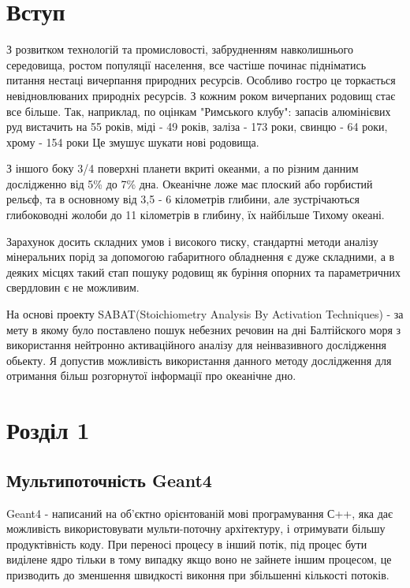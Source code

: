 \documentclass[a4paper, 14pt]{article}
\numberwithin{equation}{section}
\numberwithin{table}{section}
\begin{document}
\newpage
\tableofcontents
\newpage
\pagestyle{plain}
\setcounter{page}{2}
	
\newpage
\section{Вступ}

З розвитком технологій та промисловості, забрудненням навколишнього середовища, ростом популяції населення, все частіше починає підніматись питання нестаці вичерпання природних ресурсів. Особливо гостро це торкається невідновлюваних природніх ресурсів. З кожним роком вичерпаних родовищ стає все більше. Так, наприклад, по оцінкам "Римського клубу": запасів алюмінієвих руд вистачить на 55 років, міді - 49 років, заліза - 173 роки, свинцю - 64 роки, хрому - 154 роки Це змушує шукати нові родовища.

З іншого боку 3/4 поверхні планети вкриті океанми, а по різним данним дослідженно від 5\% до 7\% дна.
Океанічне ложе має плоский або горбистий рельєф, та в основному від 3,5 - 6 кілометрів глибини, але зустрічаються глибоководні жолоби до 11 кілометрів в глибину, їх найбільше Тихому океані. 

Зарахунок досить складних умов і високого тиску, стандартні методи аналізу мінеральних порід за допомогою габаритного обладнення є дуже складними, а в деяких місцях такий єтап пошуку родовищ як буріння опорних та параметричних свердловин є не можливим.

На основі проекту SABAT(Stoichiometry Analysis By Activation Techniques) - за мету в якому було поставлено пошук небезних речовин на дні Балтійского моря з використання нейтронно активаційного аналізу для неінвазивного дослідження обьекту. Я допустив можливість використання данного методу дослідження для отримання більш розгорнутої інформації про океанічне дно.	


\setcounter{figure}{0} 
\newpage
\section{Розділ 1}
\setcounter{figure}{0} 
\subsection{Мультипоточність Geant4}
Geant4 - написаний на об'єктно орієнтованій мові програмування С++, яка дає можливість використовувати мульти-поточну архітектуру, і отримувати більшу продуктівність коду. При переносі процесу в інший потік, під процес бути виділене ядро тільки в тому випадку якщо воно не зайнете іншим процесом, це призводить до зменшення швидкості виконня при збільшенні кількості потоків. 
\end{document}
